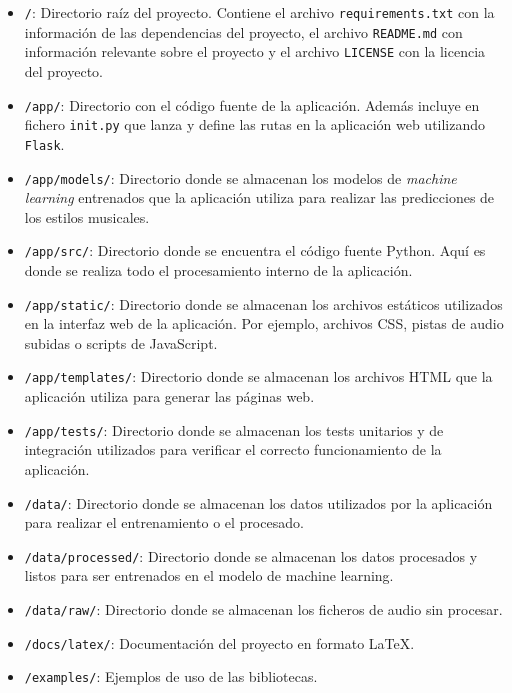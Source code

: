 \begin{itemize}
\tightlist

\item \texttt{/}: Directorio raíz del proyecto. Contiene el archivo \texttt{requirements.txt} con la información de las dependencias del proyecto, el archivo \texttt{README.md} con información relevante sobre el proyecto y el archivo \texttt{LICENSE} con la licencia del proyecto.

\item \texttt{/app/}: Directorio con el código fuente de la aplicación. Además incluye en fichero \texttt{\textunderscore\textunderscore init\textunderscore\textunderscore .py} que lanza y define las rutas en la aplicación web utilizando \texttt{Flask}.

\item \texttt{/app/models/}: Directorio donde se almacenan los modelos de \emph{machine learning} entrenados que la aplicación utiliza para realizar las predicciones de los estilos musicales.

\item \texttt{/app/src/}: Directorio donde se encuentra el código fuente Python. Aquí es donde se realiza todo el procesamiento interno de la aplicación.

\item \texttt{/app/static/}: Directorio donde se almacenan los archivos estáticos utilizados en la interfaz web de la aplicación. Por ejemplo, archivos CSS, pistas de audio subidas o scripts de JavaScript.

\item \texttt{/app/templates/}: Directorio donde se almacenan los archivos HTML que la aplicación utiliza para generar las páginas web.

\item \texttt{/app/tests/}: Directorio donde se almacenan los tests unitarios y de integración utilizados para verificar el correcto funcionamiento de la aplicación.

\item \texttt{/data/}: Directorio donde se almacenan los datos utilizados por la aplicación para realizar el entrenamiento o el procesado.

\item \texttt{/data/processed/}: Directorio donde se almacenan los datos procesados y listos para ser entrenados en el modelo de machine learning.

\item \texttt{/data/raw/}: Directorio donde se almacenan los ficheros de audio sin procesar.

\item \texttt{/docs/latex/}: Documentación del proyecto en formato \LaTeX.

\item \texttt{/examples/}: Ejemplos de uso de las bibliotecas.

\end{itemize}

